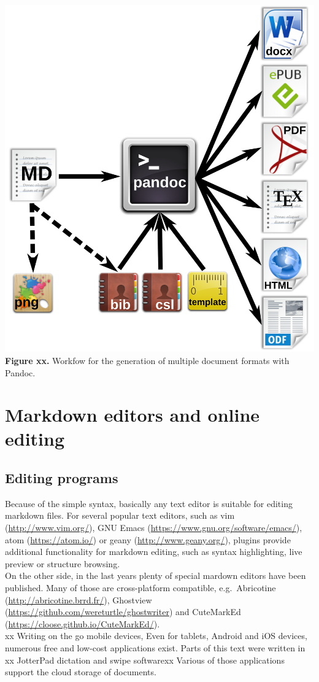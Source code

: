 \documentclass[10pt,fleq]{wlpeerj}
\begin{document}
\includegraphics{fig-pandoc-workflow.png}
\textbf{Figure
xx.}
Workfow
for the
generation
of
multiple
document
formats
with
Pandoc.

\section{Markdown
editors
and online
editing}\label{markdown-editors-and-online-editing}

\subsection{Editing
programs}\label{editing-programs}

Because of
the simple
syntax,
basically
any text
editor is
suitable
for
editing
markdown
files. For
several
popular
text
editors,
such as
vim
(\url{http://www.vim.org/}),
GNU Emacs
(\url{https://www.gnu.org/software/emacs/}),
atom
(\url{https://atom.io/})
or geany
(\url{http://www.geany.org/}),
plugins
provide
additional
functionality
for
markdown
editing,
such as
syntax
highlighting,
live
preview or
structure
browsing.\\
On the
other
side, in
the last
years
plenty of
special
mardown
editors
have been
published.
Many of
those are
cross-platform
compatible,
e.g.~Abricotine
(\url{http://abricotine.brrd.fr/}),
Ghostview
(\url{https://github.com/wereturtle/ghostwriter})
and
CuteMarkEd
(\url{https://cloose.github.io/CuteMarkEd/}).\\
xx Writing
on the go
mobile
devices,
Even for
tablets,
Android
and iOS
devices,
numerous
free and
low-cost
applications
exist.
Parts of
this text
were
written in
xx
JotterPad
dictation
and swipe
softwarexx
Various of
those
applications
support
the cloud
storage of
documents.
\end{document}
